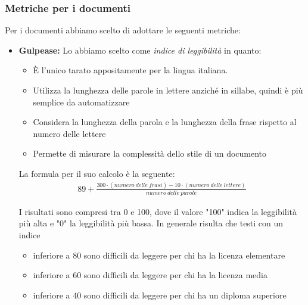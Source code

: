 \documentclass[a4paper]{article}
\begin{document}
				
				
				
				
			\subsubsection{Metriche per i documenti}
				Per i documenti abbiamo scelto di adottare le seguenti metriche: 
				
				\begin{itemize}
				\item \textbf{Gulpease:} Lo abbiamo scelto come \emph{indice di leggibilità} in quanto:
				\begin{itemize}
					\item È l'unico tarato appositamente per la lingua italiana.
					\item Utilizza la lunghezza delle parole in lettere anziché in sillabe, quindi è più semplice da automatizzare
					\item Considera la lunghezza della parola e la lunghezza della frase rispetto al numero delle lettere
					\item Permette di misurare la complessità dello stile di un documento
				
				\end{itemize}
				La formula per il suo calcolo è la seguente:
				\begin{align}
					89+\frac{300\cdot(numero\ delle\ frasi)-10\cdot(numero\ delle\ lettere)}{numero\ delle\ parole}
				\end{align}
				
				I risultati sono compresi tra 0 e 100, dove il valore "100" indica la leggibilità più alta e "0" la leggibilità
				più bassa. In generale risulta che testi con un indice
				\begin{itemize}
					\item inferiore a 80 sono difficili da leggere per chi ha la licenza elementare
					\item inferiore a 60 sono difficili da leggere per chi ha la licenza media
					\item inferiore a 40 sono difficili da leggere per chi ha un diploma superiore
				\end{itemize}
	

\end{itemize}
\end{document}
